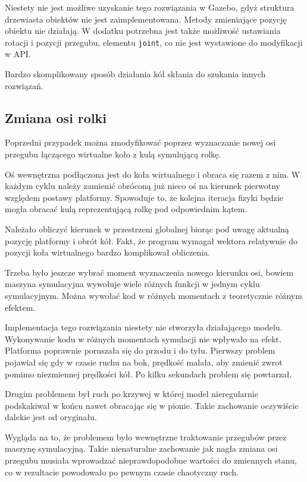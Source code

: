 Niestety nie jest możliwe uzyskanie tego rozwiązania w Gazebo, gdyż struktura drzewiasta obiektów nie jest zaimplementowana.
Metody zmieniające pozycję obiektu nie działają.
W dodatku potrzebna jest także możliwość ustawiania rotacji i pozycji przegubu, elementu \texttt{joint}, co nie jest wystawione do modyfikacji w API.

Bardzo skomplikowany sposób działania kół skłania do szukania innych rozwiązań.

\subsection{Zmiana osi rolki}
Poprzedni przypadek można zmodyfikować poprzez wyznaczanie nowej osi przegubu łączącego wirtualne koło z kulą symulującą rolkę.

Oś wewnętrzna podłączona jest do koła wirtualnego i obraca się razem z nim.
W każdym cyklu należy zamienić obróconą już nieco oś na kierunek pierwotny względem postawy platformy.
Spowoduje to, że kolejna iteracja fizyki będzie mogła obracać kulą reprezentującą rolkę pod odpowiednim kątem.

Należało obliczyć kierunek w przestrzeni globalnej biorąc pod uwagę aktualną pozycję platformy i obrót kół.
Fakt, że program wymagał wektora relatywnie do pozycji koła wirtualnego bardzo komplikował obliczenia.

Trzeba było jeszcze wybrać moment wyznaczenia nowego kierunku osi, bowiem maszyna symulacyjna wywołuje wiele różnych funkcji w jednym cyklu symulacyjnym.
Można wywołać kod w różnych momentach z teoretycznie różnym efektem. 

Implementacja tego rozwiązania niestety nie stworzyła działającego modelu.
Wykonywanie kodu w różnych momentach symulacji nie wpływało na efekt.
Platforma poprawnie poruszała się do przodu i do tyłu. 
Pierwszy problem pojawiał się gdy w czasie ruchu na bok, prędkość malała, aby zmienić zwrot pomimo niezmiennej prędkości kół.
Po kilku sekundach problem się powtarzał.

Drugim problemem był ruch po krzywej w której model nieregularnie podskakiwał w końcu nawet obracając się w pionie.
Takie zachowanie oczywiście dalekie jest od oryginału.

Wygląda na to, że problemem było wewnętrzne traktowanie przegubów przez maszynę symulacyjną.
Takie nienaturalne zachowanie jak nagła zmiana osi przegubu musiała wprowadzać nieprawdopodobne wartości do zmiennych stanu, co w rezultacie powodowało po pewnym czasie chaotyczny ruch.

